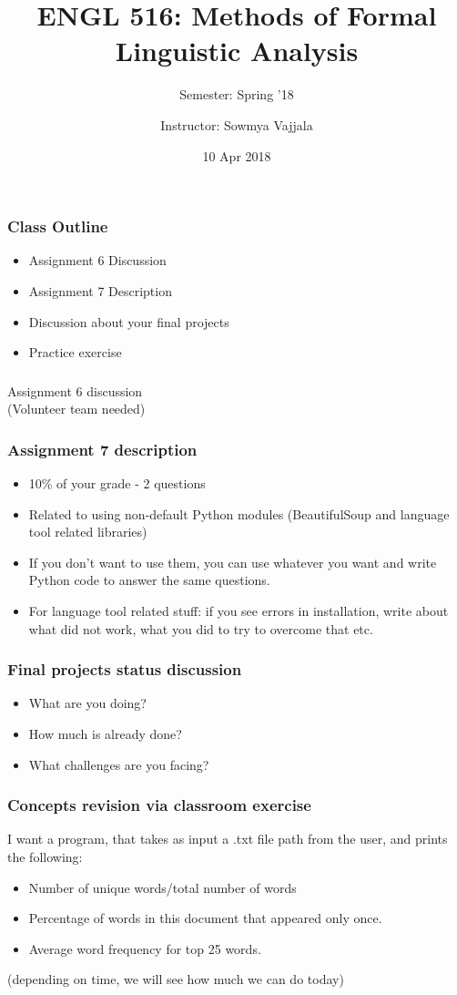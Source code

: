\documentclass{beamer}
\author[Sowmya Vajjala]{Instructor: Sowmya Vajjala}
\title[ENGL 516]{ENGL 516: Methods of Formal Linguistic Analysis}
\subtitle{Semester: Spring '18}
\date{10 Apr 2018}
\institute{Iowa State University, USA}
\begin{document}
\begin{frame}\titlepage
\end{frame}

\begin{frame}
\frametitle{Class Outline}
\begin{itemize}
\item Assignment 6 Discussion
\item Assignment 7 Description
\item Discussion about your final projects
\item Practice exercise \end{itemize}
\end{frame}

\begin{frame}
\frametitle{}
\Large Assignment 6 discussion
\\ \small (Volunteer team needed)
\end{frame}

\begin{frame}
\frametitle{Assignment 7 description}
\begin{itemize}
\item 10\% of your grade - 2 questions
\item Related to using non-default Python modules (BeautifulSoup and language tool related libraries)
\item If you don't want to use them, you can use whatever you want and write Python code to answer the same questions.
\item For language tool related stuff: if you see errors in installation, write about what did not work, what you did to try to overcome that etc. 
\end{itemize}
\end{frame}

\begin{frame}
\frametitle{Final projects status discussion}
\begin{itemize}
\item What are you doing?
\item How much is already done?
\item What challenges are you facing?
\end{itemize}
\end{frame}

\begin{frame}
\frametitle{Concepts revision via classroom exercise}
I want a program, that takes as input a .txt file path from the user, and prints the following: 
\begin{itemize}
\item Number of unique words/total number of words
\item Percentage of words in this document that appeared only once.
\item Average word frequency for top 25 words.
\end{itemize}
(depending on time, we will see how much we can do today)
\end{frame}
\end{document}
